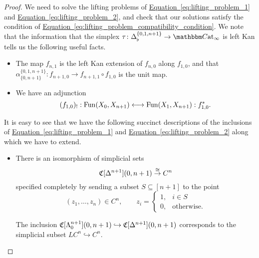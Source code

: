 \documentclass[main.tex]{subfiles}
\begin{document}
\begin{proof}
  We need to solve the lifting problems of \hyperref[eq:lifting_problem_1]{Equation~\ref*{eq:lifting_problem_1}} and \hyperref[eq:lifting_problem_2]{Equation~\ref*{eq:lifting_problem_2}}, and check that our solutions satisfy the condition of \hyperref[eq:lifting_problem_compatibility_condition]{Equation~\ref*{eq:lifting_problem_compatibility_condition}}. We note that the information that the simplex $\tau\colon \Delta^{\{0,1,n+1\}}_{\flat} \to \ICCat$ is left Kan tells us the following useful facts.
  \begin{itemize}
    \item  The map $f_{n,1}$ is the left Kan extension of $f_{n, 0}$ along $f_{1, 0}$, and that $\alpha_{\{0,n+1\}}^{\{0,1,n+1\}}\colon f_{n+1,0} \to f_{n+1, 1} \circ f_{1, 0} $ is the unit map.

    \item We have an adjunction
  \begin{equation*}
    (f_{1,0})_{!} : \mathrm{Fun}(X_{0}, X_{n+1}) \longleftrightarrow \mathrm{Fun}(X_{1}, X_{n+1}) : f_{1,0}^{*}.
  \end{equation*}
  \end{itemize}

  It is easy to see that we have the following succinct descriptions of the inclusions of \hyperref[eq:lifting_problem_1]{Equation~\ref*{eq:lifting_problem_1}} and \hyperref[eq:lifting_problem_2]{Equation~\ref*{eq:lifting_problem_2}} along which we have to extend.
  \begin{itemize}
    \item There is an isomorphism of simplicial sets
      \begin{equation*}
        \mathfrak{C}[\Delta^{n+1}](0, n+1) \overset{\cong}{\to} C^{n}
      \end{equation*}
      specified completely by sending a subset $S \subseteq [n+1]$ to the point
      \begin{equation*}
        (z_{1}, \ldots, z_{n}) \in C^{n},\qquad z_{i} =
        \begin{cases}
          1, & i \in S \\
          0, &\text{otherwise.}
        \end{cases}
      \end{equation*}

      The inclusion $\mathfrak{C}[\Lambda^{n+1}_{0}](0, n+1) \hookrightarrow \mathfrak{C}[\Delta^{n+1}](0, n+1)$ corresponds to the simplicial subset $LC^{n} \hookrightarrow C^{n}$.


\end{itemize}
\end{proof}
\end{document}
